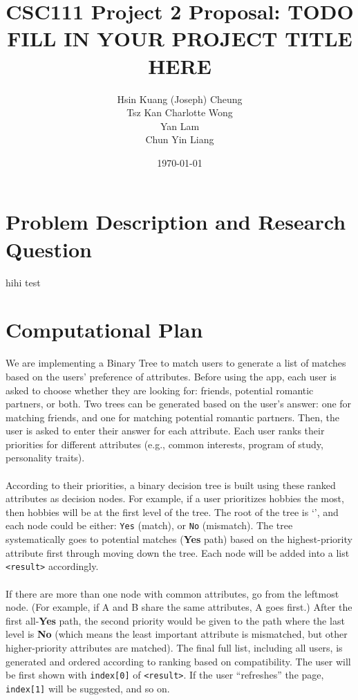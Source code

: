 \documentclass[fontsize=11pt]{article}
\title{CSC111 Project 2 Proposal: TODO FILL IN YOUR PROJECT TITLE HERE}
\author{Hsin Kuang (Joseph) Cheung \\ Tsz Kan Charlotte Wong \\ Yan Lam \\ Chun Yin Liang}
\date{\today}
\begin{document}
\maketitle

\section*{Problem Description and Research Question}

hihi
test

\section*{Computational Plan}

We are implementing a Binary Tree to match users to generate a list of matches based on the users’ preference of attributes. Before using the app, each user is asked to choose whether they are looking for: friends, potential romantic partners, or both.
Two trees can be generated based on the user’s answer: one for matching friends, and one for matching potential romantic partners.
Then, the user is asked to enter their answer for each attribute.
Each user ranks their priorities for different attributes (e.g., common interests, program of study, personality traits).
\\
\\
According to their priorities, a binary decision tree is built using these ranked attributes as decision nodes.
For example, if a user prioritizes hobbies the most, then hobbies will be at the first level of the tree.
The root of the tree is ‘’, and each node could be either: \texttt{Yes} (match), or \texttt{No} (mismatch).
The tree systematically goes to potential matches (\textbf{Yes} path) based on the highest-priority attribute first through moving down the tree.
Each node will be added into a list \texttt{<result>} accordingly.
\\
\\
If there are more than one node with common attributes, go from the leftmost node. (For example, if A and B share the same attributes, A goes first.)
After the first all-\textbf{Yes} path, the second priority would be given to the path where the last level is \textbf{No} (which means the least important attribute is mismatched, but other higher-priority attributes are matched).
The final full list, including all users, is generated and ordered according to ranking based on compatibility.
The user will be first shown with \texttt{index[0]} of \texttt{<result>}.
If the user “refreshes” the page, \texttt{index[1]} will be suggested, and so on.
\end{document}
